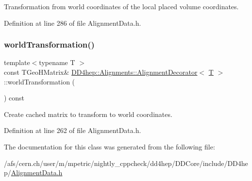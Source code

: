 Transformation from world coordinates of the local placed volume coordinates. 



Definition at line 286 of file Alignment\+Data.\+h.

\hypertarget{class_d_d4hep_1_1_alignments_1_1_alignment_decorator_a01b40f6c0327de44b984470beb197618}{}\label{class_d_d4hep_1_1_alignments_1_1_alignment_decorator_a01b40f6c0327de44b984470beb197618} 
\subsubsection{\texorpdfstring{world\+Transformation()}{worldTransformation()}}
{\footnotesize\ttfamily template$<$typename T $>$ \\
const T\+Geo\+H\+Matrix\& \hyperlink{class_d_d4hep_1_1_alignments_1_1_alignment_decorator}{D\+D4hep\+::\+Alignments\+::\+Alignment\+Decorator}$<$ \hyperlink{class_t}{T} $>$\+::world\+Transformation (\begin{DoxyParamCaption}{ }\end{DoxyParamCaption}) const\hspace{0.3cm}{\ttfamily [inline]}}



Create cached matrix to transform to world coordinates. 



Definition at line 262 of file Alignment\+Data.\+h.



The documentation for this class was generated from the following file\+:\begin{DoxyCompactItemize}
\item 
/afs/cern.\+ch/user/m/mpetric/nightly\+\_\+cppcheck/dd4hep/\+D\+D\+Core/include/\+D\+D4hep/\hyperlink{_alignment_data_8h}{Alignment\+Data.\+h}\end{DoxyCompactItemize}
